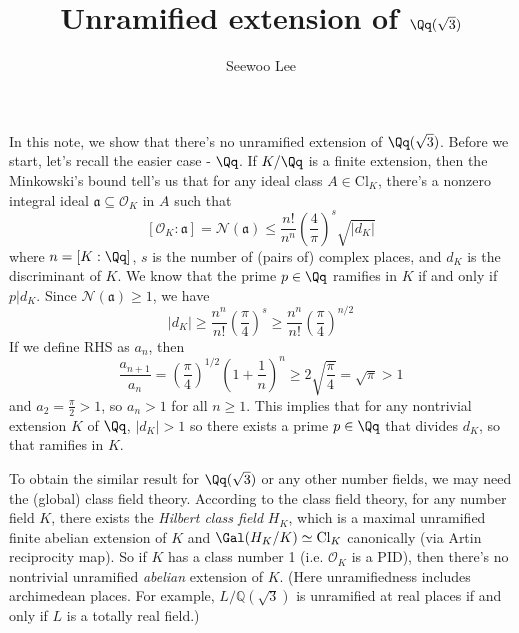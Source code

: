 \documentclass{article}
\title{Unramified extension of $\Qq(\sqrt{3})$}
\author{Seewoo Lee}
\begin{document}
\maketitle


In this note, we show that there's no unramified extension of $\Qq(\sqrt{3})$. Before we start, let's recall the easier case - $\Qq$. 
If $K/\Qq$ is a finite extension, then the Minkowski's bound tell's us that for any ideal class $A\in \mathrm{Cl}_{K}$,  there's a nonzero integral ideal $\mathfrak{a}\subseteq \mathcal{O}_{K}$ in $A$ such that 
$$
[\mathcal{O}_{K}:\mathfrak{a}] = \mathcal{N}(\mathfrak{a}) \leq \frac{n!}{n^{n}} \left( \frac{4}{\pi}\right)^{s} \sqrt{|d_{K}|}
$$
where $n = [K:\Qq]$, $s$ is the number of (pairs of) complex places, and $d_K$ is the discriminant of $K$. We know that the prime $p\in \Qq$ ramifies in $K$ if and only if $p|d_K$. 
Since $\mathcal{N}(\mathfrak{a})\geq 1$, we have
$$
|d_{K}| \geq \frac{n^{n}}{n!}\left(\frac{\pi}{4}\right)^{s} \geq \frac{n^{n}}{n!} \left(\frac{\pi}{4}\right)^{n/2}
$$
If we define RHS as $a_{n}$, then 
$$
\frac{a_{n+1}}{a_{n}} = \left( \frac{\pi}{4}\right)^{1/2}\left( 1 + \frac{1}{n}\right)^{n} \geq 2\sqrt{\frac{\pi}{4}} = \sqrt{\pi} > 1
$$
and $a_{2} = \frac{\pi}{2} > 1$, so $a_{n} >1$ for all $n\geq 1$. 
This implies that for any nontrivial extension $K$ of $\Qq$, $|d_{K}|>1$ so there exists a prime $p\in \Qq$ that divides $d_{K}$, so that ramifies in $K$. 

To obtain the similar result for $\Qq(\sqrt{3})$ or any other number fields, we may need the (global) class field theory. According to the class field theory, for any number field $K$,  there exists the \emph{Hilbert class field} $H_K$, which is a maximal unramified finite abelian extension of $K$ and $\Gal(H_K/K) \simeq \mathrm{Cl}_{K}$ canonically (via Artin reciprocity map). 
So if $K$ has a class number 1 (i.e. $\mathcal{O}_{K}$ is a PID), then there's no nontrivial unramified \emph{abelian} extension of $K$. 
(Here unramifiedness includes archimedean places. For example, $L/\mathbb{Q}(\sqrt{3})$ is unramified at real places if and only if $L$ is a totally real field.) 
\end{document}
